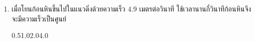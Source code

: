 \begin{enumerate}
\item \runningj {} เมื่อโยนก้อนหินขึ้นไปในแนวดิ่งด้วยความเร็ว   4.9  เมตรต่อวินาที   ใช้เวลานานกี่วินาทีก้อนหินจึงจะมีความเร็วเป็นศูนย์
\begin{4c}
	{0.5}{1.0}{2.0}{4.0}
\end{4c}
\end{enumerate}
